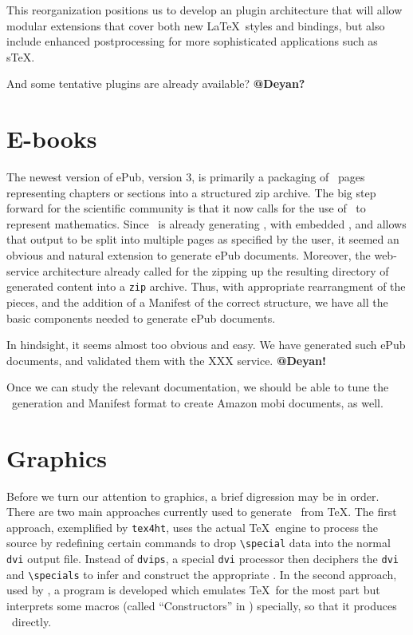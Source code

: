 \documentclass{llncs}
\def\ebooks{\mbox{E-books}\xspace}
\begin{document}
This reorganization positions us to develop an 
plugin architecture that will allow modular extensions
that cover both new \LaTeX\ styles and bindings, but also
include enhanced postprocessing for more sophisticated applications
such as s\TeX.

And some tentative plugins are already available? \textbf{@Deyan?}

\section{\ebooks}\label{ebooks}
The newest version of ePub, version 3, is primarily a packaging
of \HTML\ pages representing chapters or sections into a structured
zip archive. The big step forward for the scientific community
is that it now calls for the use of \MathML\
to represent mathematics. Since \LaTeXML\ is already generating \HTML,
with embedded \MathML, and allows that output to be split into
multiple pages as specified by the user, it seemed an obvious
and natural extension to generate ePub documents. Moreover, the
web-service architecture already called for the zipping up the resulting
directory of generated content into a \texttt{zip}
archive.  Thus, with appropriate rearrangment of the pieces,
and the addition of a Manifest of the correct structure,
we have all the basic components needed to generate ePub documents.

In hindsight, it seems almost too obvious and 
easy. We have generated such ePub documents,
and validated them with the XXX service. \textbf{@Deyan!}

Once we can study the relevant documentation, we should be able to
tune the \HTML\ generation and Manifest format to create
Amazon mobi documents, as well.

\section{Graphics}\label{graphics}
Before we turn our attention to graphics,
a brief digression may be in order.
There are two main approaches currently used to generate
\HTML\ from \TeX. The first approach,
exemplified by \texttt{tex4ht}, uses the actual \TeX\ engine
to process the source by redefining certain commands to drop
\verb|\special| data into the normal \texttt{dvi} output file.
Instead of \texttt{dvips}, a special \texttt{dvi} processor then deciphers
the \texttt{dvi} and \verb|\specials|
to infer and construct the appropriate \HTML.
In the second approach, used by \LaTeXML, a program
is developed which emulates \TeX\ for the most part
but interprets some macros (called ``Constructors'' in \LaTeXML)
specially, so that it produces \XML\ directly.
\end{document}
